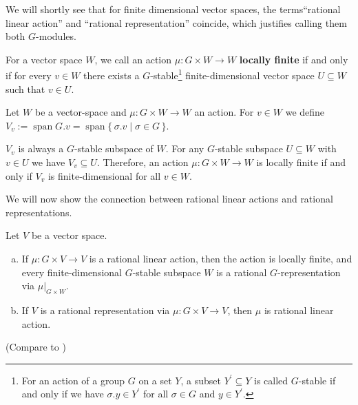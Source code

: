 We will shortly see that for finite dimensional vector spaces, the terms\linebreak ``rational linear action'' and ``rational representation'' coincide, which justifies calling them both $G$-modules.

\begin{definition}
  For a vector space $W$, we call an action $\mu \colon G \times W \rightarrow W$ \textbf{locally finite} if and only if for every $v \in W$ there exists a $G$-stable\footnote{For an action of a group $G$ on a set $Y$, a subset $Y^\prime \subseteq Y$ is called $G$-stable if and only if we have $\sigma.y \in Y^\prime$ for all $\sigma \in G$ and $y \in Y^\prime$.} finite-dimensional vector space $U \subseteq W$ such that $v \in U$.
\end{definition}

\begin{definition}
  Let $W$ be a vector-space and $\mu \colon G \times W \rightarrow W$ an action.
  For $v \in W$ we define $V_v := \operatorname{span} G.v = \operatorname{span} \{\, \sigma . v \mid \sigma \in G\,\}$. %
\end{definition}

\begin{remark}
  $V_v$ is always a $G$-stable subspace of $W$. %
  For any $G$-stable subspace $U \subseteq W$ with $v \in U$ we have $V_v \subseteq U$.
  Therefore, an action $\mu \colon G \times W \rightarrow W$ is locally finite if and only if $V_v$ is finite-dimensional for all $v \in W$. %
\end{remark}

We will now show the connection between rational linear actions and rational representations.

\begin{proposition}\label{locfin}
  Let $V$ be a vector space.
  \begin{enumerate}[(a)]
  \item If $\mu \colon G \times V \rightarrow V$ is a rational linear action, then the action is locally finite, and every
    finite-dimensional $G$-stable subspace $W$ is a rational \linebreak$G$-representation via $\left. \mu \right|_{G\times W}$.
  \item If $V$ is a rational representation via $\mu \colon G \times V \rightarrow V$, then $\mu$ is rational linear action.
  \end{enumerate}
  (Compare to \cite[A.1.8, 2.2.5]{DK15})
\end{proposition}

